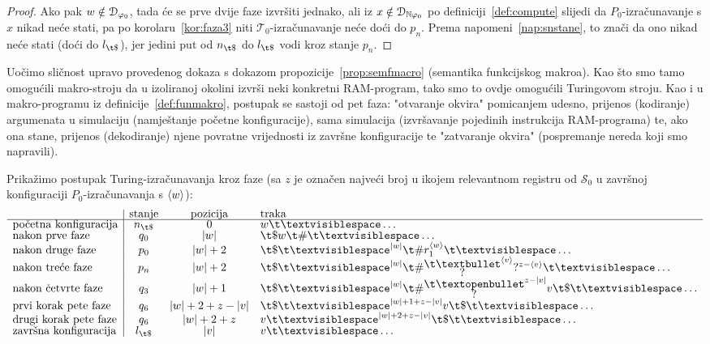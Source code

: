 \begin{proof}
	Ako pak $w\notin\mathcal D_{\varphi_0}$, tada će se prve dvije faze izvršiti jednako, ali iz $x\notin\mathcal D_{{\mathbb N}\varphi_0}$ po definiciji~\ref{def:compute} slijedi da $P_0$-izračunavanje s $x$ nikad neće stati, pa po korolaru~\ref{kor:faza3} niti $\mathcal T_0$-izračunavanje neće doći do $p_n$. Prema napomeni~\ref{nap:snstane}, to znači da ono nikad neće stati (doći do $l_{\t\$}$), jer jedini put od $n_{\t\$}$ do $l_{\t\$}$ vodi kroz stanje $p_n$.
\end{proof}

Uočimo sličnost upravo provedenog dokaza s dokazom propozicije~\ref{prop:semfmacro} (semantika funkcijskog makroa). Kao što smo tamo omogućili makro-stroju da u izoliranoj okolini izvrši neki konkretni RAM-program, tako smo to ovdje omogućili Turingovom stroju. Kao i u makro-programu iz definicije~\ref{def:funmakro}, postupak se sastoji od pet faza: "otvaranje okvira" pomicanjem udesno, prijenos (kodiranje) argumenata u simulaciju (namještanje početne konfiguracije), sama simulacija (izvršavanje pojedinih instrukcija RAM-programa) te, ako ona stane, prijenos (dekodiranje) njene povratne vrijednosti iz završne konfiguracije te "zatvaranje okvira" (pospremanje nereda koji smo napravili).

Prikažimo postupak Turing-iz\-ra\-ču\-na\-va\-nja kroz faze (sa $z$ je označen najveći broj u ikojem relevantnom registru od $\mathcal S_0$ u završnoj konfiguraciji $P_0$-izračunavanja s $\langle w\rangle$):
\begin{equation}
\begin{array}{l|ccl}
                             &\text{stanje}&\text{pozicija}&\text{traka}\\\hline
    \text{početna konfiguracija} & n_{\t\$} & 0         & w\bl\ldots \\
\text{nakon prve faze}       & q_0 & \dulj w   & \t\$w\t\#\bl\ldots \\
\text{nakon druge faze}      & p_0 & \dulj w+2 & \t\$\bl^{\dulj w}\t\#r_1^{\kr w}\bl\ldots \\
\text{nakon treće faze}      & p_n & \dulj w+2 & \renewcommand{\arraystretch}{0.1}
    \t\$\bl^{\dulj w}\t\#\begin{array}{@{}c@{}}\t\textbullet\\?\end{array}^{\kr{v}}?^{z-\kr{v}}\bl\ldots\\
\text{nakon četvrte faze}    & q_3 & \dulj w+1 &
\renewcommand{\arraystretch}{0.1}
\t\$\bl^{\dulj w}\t\#\begin{array}{@{}c@{}}\t\textopenbullet\\?\end{array}^{z-\dulj v}v\t\$\bl\ldots\\
\text{prvi korak pete faze} & q_6 & \dulj w+2+z-\dulj v       & \t\$\bl^{\dulj w+1+z-\dulj v}v\t\$\bl\ldots\\
\text{drugi korak pete faze}& q_6 & \dulj w+2+z & v\bl^{\dulj w+2+z-\dulj v}\t\$\bl\ldots\\
    \text{završna konfiguracija} & l_{\t\$} & \dulj v   & v\bl\ldots
\end{array}
\end{equation}

